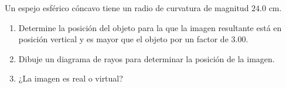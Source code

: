 \item Un espejo esférico cóncavo tiene un radio de curvatura de magnitud $24.0\text{ cm}$.
\begin{enumerate}
    \item Determine la posición del objeto para la que la imagen resultante está en posición vertical y es mayor que el objeto por un factor de $3.00$.
    \item Dibuje un diagrama de rayos para determinar la posición de la imagen.
    \item ¿La imagen es real o virtual?
\end{enumerate}